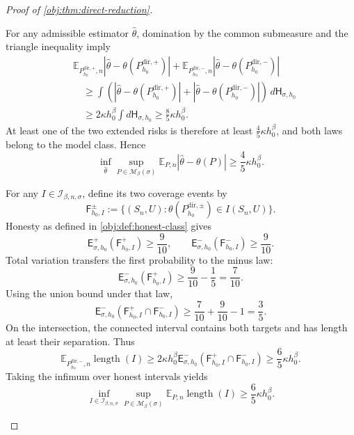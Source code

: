 \documentclass[11pt]{article}
\begin{document}
\begin{proof}[Proof of \cref{obj:thm:direct-reduction}]
\begin{enumerate}
For any admissible estimator \(\widehat\theta\), domination by the common submeasure and the triangle inequality imply
\[
\begin{aligned}
&\mathbb E_{P_{h_0}^{\mathrm{dir},+},n}
|\widehat\theta-\theta(P_{h_0}^{\mathrm{dir},+})|
+
\mathbb E_{P_{h_0}^{\mathrm{dir},-},n}
|\widehat\theta-\theta(P_{h_0}^{\mathrm{dir},-})|\\
&\quad\ge
\int\left(
|\widehat\theta-\theta(P_{h_0}^{\mathrm{dir},+})|
+
|\widehat\theta-\theta(P_{h_0}^{\mathrm{dir},-})|
\right)\,d\mathsf H_{\sigma,h_0}\\
&\quad\ge
2\kappa h_0^\beta\int d\mathsf H_{\sigma,h_0}
\ge\frac85\kappa h_0^\beta.
\end{aligned}
\]
At least one of the two extended risks is therefore at least
\(\frac45\kappa h_0^\beta\), and both laws belong to the model class. Hence
\[
\inf_{\widehat\theta}
\sup_{P\in\mathcal M_\beta(\sigma)}
\mathbb E_{P,n}|\widehat\theta-\theta(P)|
\ge\frac45\kappa h_0^\beta.
\]

For any \(I\in\mathcal I_{\beta,n,\sigma}\), define its two coverage events by
\[
\mathsf F_{h_0,I}^{\pm}
:=
\{(S_n,U):\theta(P_{h_0}^{\mathrm{dir},\pm})\in I(S_n,U)\}.
\]
Honesty as defined in \cref{obj:def:honest-class} gives
\[
\mathsf E_{\sigma,h_0}^{+}(\mathsf F_{h_0,I}^{+})\ge\frac9{10},
\qquad
\mathsf E_{\sigma,h_0}^{-}(\mathsf F_{h_0,I}^{-})\ge\frac9{10}.
\]
Total variation transfers the first probability to the minus law:
\[
\mathsf E_{\sigma,h_0}^{-}(\mathsf F_{h_0,I}^{+})
\ge\frac9{10}-\frac15=\frac7{10}.
\]
Using the union bound under that law,
\[
\mathsf E_{\sigma,h_0}^{-}
(\mathsf F_{h_0,I}^{+}\cap\mathsf F_{h_0,I}^{-})
\ge\frac7{10}+\frac9{10}-1=\frac35.
\]
On the intersection, the connected interval contains both targets and has length at least their separation. Thus
\[
\mathbb E_{P_{h_0}^{\mathrm{dir},-},n}\operatorname{length}(I)
\ge2\kappa h_0^\beta
\mathsf E_{\sigma,h_0}^{-}
(\mathsf F_{h_0,I}^{+}\cap\mathsf F_{h_0,I}^{-})
\ge\frac65\kappa h_0^\beta.
\]
Taking the infimum over honest intervals yields
\[
\inf_{I\in\mathcal I_{\beta,n,\sigma}}
\sup_{P\in\mathcal M_\beta(\sigma)}
\mathbb E_{P,n}\operatorname{length}(I)
\ge\frac65\kappa h_0^\beta.
\]


\end{enumerate}
\end{proof}
\end{document}
